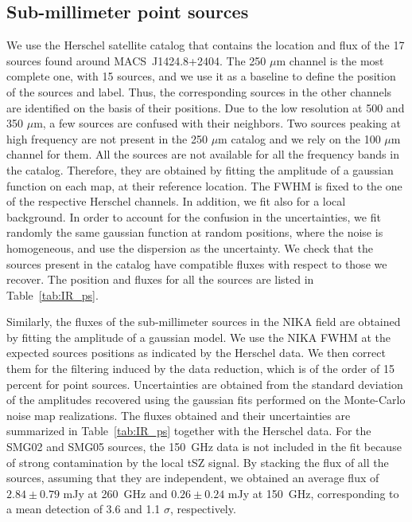 \documentclass[twocolumn,traditabstract]{aa}
\begin{document}
\subsection{Sub-millimeter point sources}
We use the Herschel satellite catalog that contains the location and flux of the 17 sources found around \mbox{MACS~J1424.8+2404}. The 250 $\mu$m channel is the most complete one, with 15 sources, and we use it as a baseline to define the position of the sources and label. Thus, the corresponding sources in the other channels are identified on the basis of their positions. Due to the low resolution at 500 and 350 $\mu$m, a few sources are confused with their neighbors. Two sources peaking at high frequency are not present in the 250 $\mu$m catalog and we rely on the 100 $\mu$m channel for them. All the sources are not available for all the frequency bands in the catalog. Therefore, they are obtained by fitting the amplitude of a gaussian function on each map, at their reference location. The FWHM is fixed to the one of the respective Herschel channels. In addition, we fit also for a local background. In order to account for the confusion in the uncertainties, we fit randomly the same gaussian function at random positions, where the noise is homogeneous, and use the dispersion as the uncertainty. We check that the sources present in the catalog have compatible fluxes with respect to those we recover. The position and fluxes for all the sources are listed in Table~\ref{tab:IR_ps}.

Similarly, the fluxes of the sub-millimeter sources in the NIKA field are obtained by fitting the amplitude of a gaussian model. We use the NIKA FWHM at the expected sources positions as indicated by the Herschel data. We then correct them for the filtering induced by the data reduction, which is of the order of 15 percent for point sources. Uncertainties are obtained from the standard deviation of the amplitudes recovered using the gaussian fits performed on the Monte-Carlo noise map realizations. The fluxes obtained and their uncertainties are summarized in Table~\ref{tab:IR_ps} together with the Herschel data. For the SMG02 and SMG05 sources, the 150~GHz data is not included in the fit because of strong contamination by the local tSZ signal. By stacking the flux of all the sources, assuming that they are independent, we obtained an average flux of $2.84 \pm 0.79$ mJy at 260~GHz and $0.26 \pm 0.24$ mJy at 150~GHz, corresponding to a mean detection of 3.6 and 1.1 $\sigma$, respectively. 
\end{document}
